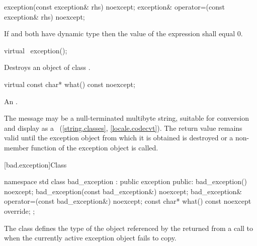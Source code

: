 %
%
\begin{itemdecl}
exception(const exception& rhs) noexcept;
exception& operator=(const exception& rhs) noexcept;
\end{itemdecl}

\begin{itemdescr}
\pnum
\ensures If  and  both have dynamic type 
then the value of the expression  shall equal 0.
\end{itemdescr}

%
\begin{itemdecl}
virtual ~exception();
\end{itemdecl}

\begin{itemdescr}
\pnum
\effects
Destroys an object of class
.
\end{itemdescr}

%
\begin{itemdecl}
virtual const char* what() const noexcept;
\end{itemdecl}

\begin{itemdescr}
\pnum
\returns
An  \ntbs{}.

\pnum
\remarks
The message may be a null-terminated multibyte string,
suitable for conversion and display as a
~(\ref{string.classes}, \ref{locale.codecvt}).
The return value remains valid until the exception object from which
it is obtained is destroyed or a non-
member function of the exception object is called.
\end{itemdescr}

[bad.exception]{Class }

%
%
\begin{codeblock}
namespace std {
  class bad_exception : public exception {
  public:
    bad_exception() noexcept;
    bad_exception(const bad_exception&) noexcept;
    bad_exception& operator=(const bad_exception&) noexcept;
    const char* what() const noexcept override;
  };
}
\end{codeblock}

\pnum
The class
defines the type of the object
referenced by the 
returned from a call to 
when the currently active exception object fails to copy.


